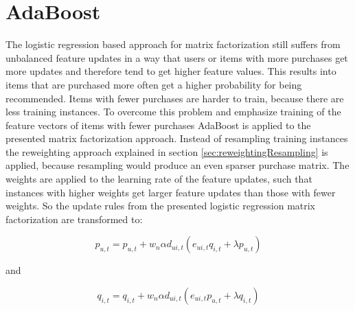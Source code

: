 \documentclass[10pt]{reportMaster}
\begin{document}
\section{AdaBoost}
\label{sec:myAdaBoost}
The logistic regression based approach for matrix factorization still suffers from unbalanced feature updates in a way that users or items with more purchases get more updates and therefore tend to get higher feature values.
This results into items that are purchased more often get a higher probability for being recommended.
Items with fewer purchases are harder to train, because there are less training instances.
To overcome this problem and emphasize training of the feature vectors of items with fewer purchases AdaBoost is applied to the presented matrix factorization approach.
Instead of resampling training instances the reweighting approach explained in section \ref{sec:reweightingResampling} is applied, because resampling would produce an even sparser purchase matrix.
The weights are applied to the learning rate of the feature updates, such that instances with higher weights get larger feature updates than those with fewer weights.
So the update rules from the presented logistic regression matrix factorization are transformed to: 

\begin{equation}
p_{u,t} = p_{u,t} + w_n \alpha d_{ui,t} (e_{ui,t} q_{i,t} + \lambda p_{u,t})
\end{equation}

and 

\begin{equation}
q_{i,t} = q_{i,t} + w_n \alpha d_{ui,t} (e_{ui,t} p_{u,t} + \lambda q_{i,t})
\end{equation}
\end{document}
